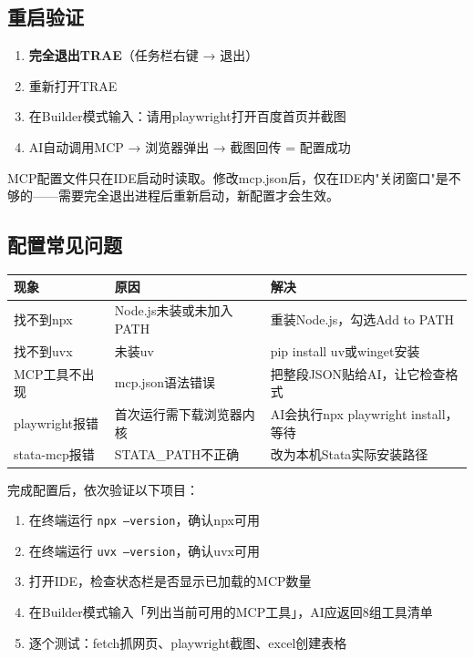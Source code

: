 \subsection{重启验证}

\begin{enumerate}[leftmargin=2em]
  \item \textbf{完全退出TRAE}（任务栏右键 → 退出）
  \item 重新打开TRAE
  \item 在Builder模式输入：请用playwright打开百度首页并截图
  \item AI自动调用MCP → 浏览器弹出 → 截图回传 = 配置成功
\end{enumerate}

\begin{notebox}[为什么要完全退出？]
MCP配置文件只在IDE启动时读取。修改mcp.json后，仅在IDE内"关闭窗口"是不够的——需要完全退出进程后重新启动，新配置才会生效。
\end{notebox}

\subsection{配置常见问题}

\begin{table}[H]
\centering
\begin{tabular}{lp{4cm}p{5cm}}
\toprule
\textbf{现象} & \textbf{原因} & \textbf{解决} \\
\midrule
找不到npx & Node.js未装或未加入PATH & 重装Node.js，勾选Add to PATH \\
找不到uvx & 未装uv & pip install uv或winget安装 \\
MCP工具不出现 & mcp.json语法错误 & 把整段JSON贴给AI，让它检查格式 \\
playwright报错 & 首次运行需下载浏览器内核 & AI会执行npx playwright install，等待 \\
stata-mcp报错 & STATA\_PATH不正确 & 改为本机Stata实际安装路径 \\
\bottomrule
\end{tabular}
\end{table}

\begin{practicebox}
完成配置后，依次验证以下项目：
\begin{enumerate}
  \item 在终端运行 \texttt{npx --version}，确认npx可用
  \item 在终端运行 \texttt{uvx --version}，确认uvx可用
  \item 打开IDE，检查状态栏是否显示已加载的MCP数量
  \item 在Builder模式输入「列出当前可用的MCP工具」，AI应返回8组工具清单
  \item 逐个测试：fetch抓网页、playwright截图、excel创建表格
\end{enumerate}
\end{practicebox}

